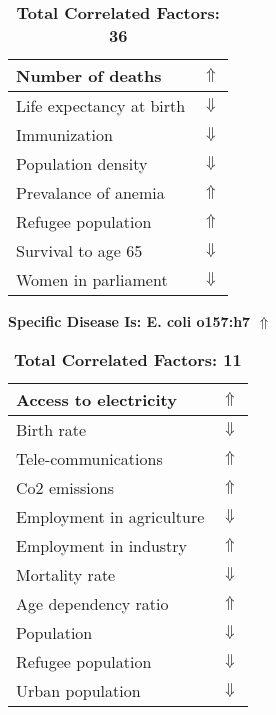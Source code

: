 \documentclass[12pt,notitlepage,oneside]{report}
\begin{document}
\begin{table}[!htb]
\begin{tabular}{|l|l|}
Number of deaths & $\Uparrow$\\ \hline
Life expectancy at birth & $\Downarrow$\\ \hline
Immunization & $\Downarrow$\\ \hline
Population density & $\Downarrow$\\ \hline
Prevalance of anemia & $\Uparrow$\\ \hline
Refugee population & $\Uparrow$\\ \hline
Survival to age 65 & $\Downarrow$\\ \hline
Women in parliament & $\Downarrow$\\ \hline
\end{tabular}
\caption*{\textbf{Total Correlated Factors: 36}}
\end{table}
\clearpage
\begin{table}[!htb]
\caption{\textbf{Specific Disease Is: E. coli o157:h7 $\Uparrow$}}
\centering
\label{Correlated Socio-economic Factors0}
\begin{tabular}{|l|l|}
\hline
Access to electricity & $\Uparrow$\\ \hline
Birth rate & $\Downarrow$\\ \hline
Tele-communications & $\Uparrow$\\ \hline
Co2 emissions & $\Uparrow$\\ \hline
Employment in agriculture & $\Downarrow$\\ \hline
Employment in industry & $\Uparrow$\\ \hline
Mortality rate & $\Downarrow$\\ \hline
Age dependency ratio & $\Uparrow$\\ \hline
Population & $\Downarrow$\\ \hline
Refugee population & $\Downarrow$\\ \hline
Urban population & $\Downarrow$\\ \hline
\end{tabular}
\caption*{\textbf{Total Correlated Factors: 11}}
\end{table}
\end{document}
